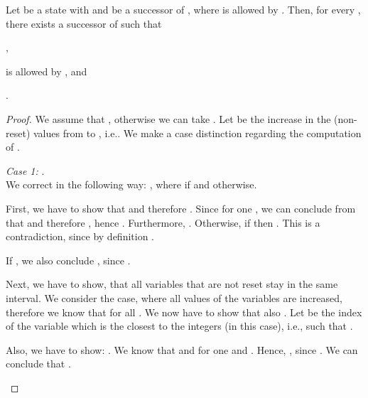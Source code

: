 \documentclass[fleqn,envcountsame]{LMCS}
\newcommand{\ie}{i.e.\xspace}
\begin{document}
\begin{lem}\label{discrete_succ}
Let  be a state with  and  be a successor
of , where  is allowed by .
Then, for every , there exists
a successor  of  such that 
\begin{iteMize}{}
\item
  ,
\item 
   is allowed by , and
\item
  .
\end{iteMize}
\end{lem}

\begin{proof}
We assume that ,
otherwise we can take .
Let  be the increase in the (non-reset) values from  to , \ie .
We make a case distinction regarding the computation of .

\textit{Case 1:} .\\
We correct  in the following way: , where
 if  and 
otherwise.

First, we have to show that  and therefore .
Since  for one , 
we can conclude from 
that  and therefore ,
hence .
Furthermore, . Otherwise, if  then
. This is a
contradiction, since by definition .

If , we also conclude , since 
.

Next, we have to show, that all variables that are not reset stay in the 
same interval. We consider the case, where all values of the variables are
increased, therefore we know that 
for all .
We now have to show that also .
Let  be the index of the variable which is the closest to the integers
(in this case), \ie , such that .

Also, we have to show: .
We know that  and
 for one 
and
.
Hence, , since
.
We can conclude that .
\begin{figure}[h]
\begin{center}
\end{center}
\end{figure}
\end{proof}
\end{document}
